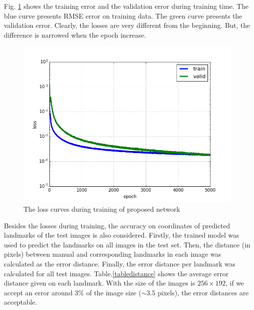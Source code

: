 \documentclass[10pt]{article}
\begin{document}
Fig. \ref{cnnlosses} shows the training error and the validation error during training time. The blue curve presents RMSE error on training data. The green curve presents the validation error. Clearly, the losses are very different from the beginning. But, the difference is narrowed when the epoch increase.

\begin{figure}[htbp]
\centering
\includegraphics[scale=0.417]{images/losses}
\caption{The loss curves during training of proposed network} 
\label{cnnlosses}
\end{figure}

Besides the losses during training, the accuracy on coordinates of predicted landmarks of the test images is also considered. Firstly, the trained model was used to predict the landmarks on all images in the test set. Then, the distance (in pixels) between manual and corresponding landmarks in each image was calculated as the error distance. Finally, the error distance per landmark was calculated for all test images. Table.\ref{tabledistance} shows the average error distance given on each landmark. With the size of the images is $256 \times 192$, if we accept an error around $3\%$ of the image size ($ \sim3.5$ pixels), the error distances are acceptable.
\end{document}

